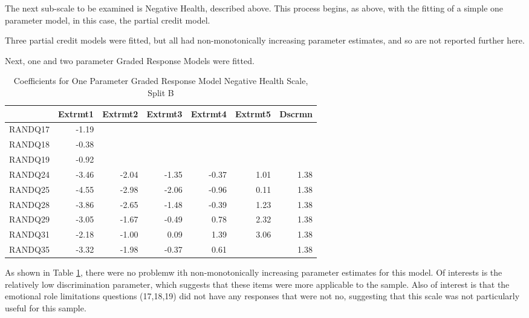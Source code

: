 \documentclass{article}
\begin{document}
The next sub-scale to be examined is Negative Health, described above.  This process begins, as above, with the fitting of a simple one parameter model, in this case, the partial credit model.


Three partial credit models were fitted, but all had non-monotonically increasing parameter estimates, and so are not reported further here. 

Next, one and two parameter Graded Response Models were fitted. 


\begin{table}[ht]
\centering
\begin{tabular}{rrrrrrr}
  \hline
 & Extrmt1 & Extrmt2 & Extrmt3 & Extrmt4 & Extrmt5 & Dscrmn \\ 
  \hline
RANDQ17 & -1.19 &  &  &  &  &  \\ 
  RANDQ18 & -0.38 &  &  &  &  &  \\ 
  RANDQ19 & -0.92 &  &  &  &  &  \\ 
  RANDQ24 & -3.46 & -2.04 & -1.35 & -0.37 & 1.01 & 1.38 \\ 
  RANDQ25 & -4.55 & -2.98 & -2.06 & -0.96 & 0.11 & 1.38 \\ 
  RANDQ28 & -3.86 & -2.65 & -1.48 & -0.39 & 1.23 & 1.38 \\ 
  RANDQ29 & -3.05 & -1.67 & -0.49 & 0.78 & 2.32 & 1.38 \\ 
  RANDQ31 & -2.18 & -1.00 & 0.09 & 1.39 & 3.06 & 1.38 \\ 
  RANDQ35 & -3.32 & -1.98 & -0.37 & 0.61 &  & 1.38 \\ 
   \hline
\end{tabular}
\caption{Coefficients for One Parameter Graded Response Model Negative Health Scale, Split B} 
\label{tab:neghealth2bgrm1pl}
\end{table}

As shown in Table \ref{tab:neghealth2bgrm1pl}, there were no problemw ith non-monotonically increasing parameter estimates for this model. Of interests is the relatively low discrimination parameter, which suggests that these items were more applicable to the sample. Also of interest is that the emotional role limitations questions (17,18,19) did not have any responses that were not no, suggesting that this scale was not particularly useful for this sample. 
\end{document}
